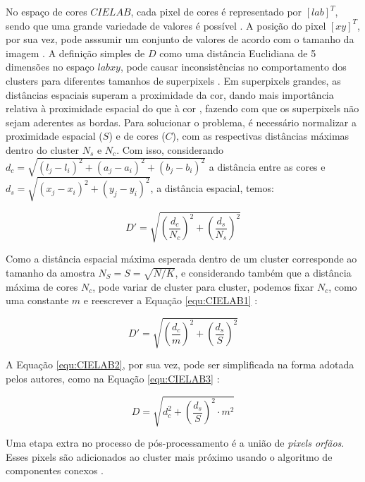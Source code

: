 \begin{document}
No espaço de cores $CIELAB$, cada pixel de cores é representado por $[l a b]^T$, sendo que uma grande variedade de valores é possível \cite{SLIC}. A posição do pixel $[x y]^T$, por sua vez, pode asssumir um conjunto de valores de acordo com o tamanho da imagem \cite{SLIC}. A definição simples de $D$ como uma distância Euclidiana de 5 dimensões no espaço $labxy$, pode causar inconsistências no comportamento dos clusters para diferentes tamanhos de superpixels \cite{SLIC}. Em superpixels grandes, as distâncias espaciais superam a proximidade da cor, dando mais importância relativa à proximidade espacial do que à cor \cite{SLIC}, fazendo com que os superpixels não sejam aderentes as bordas. Para solucionar o problema, é necessário normalizar a proximidade espacial ($S$) e de cores ($C$), com as respectivas distâncias máximas dentro do cluster $N_s$ e $N_c$. Com isso, considerando $d_c = \sqrt{(l_j - l_i)^2 + (a_j - a_i)^2 + (b_j - b_i)^2}$ a distância entre as cores e $d_s =  \sqrt{(x_j - x_i)^2 + (y_j - y_i)^2}$, a distância espacial, temos:

\begin{equation}
 D' = \sqrt{ \left(\frac{d_c}{N_c} \right)^2 + \left(\frac{d_s}{N_s} \right)^2}
 \label{equ:CIELAB1}
\end{equation}

Como a distância espacial máxima esperada dentro de um cluster corresponde ao tamanho da amostra $N_S = S = \sqrt{N/K}$, e considerando também que a distância máxima de cores $N_c$, pode variar de cluster para cluster, podemos fixar $N_c$, como uma constante $m$ e reescrever a Equação \ref{equ:CIELAB1} \cite{SLIC}:

\begin{equation}
 D' = \sqrt{ \left(\frac{d_c}{m} \right)^2 + \left(\frac{d_s}{S} \right)^2}
 \label{equ:CIELAB2}
\end{equation}

A Equação \ref{equ:CIELAB2}, por sua vez, pode ser simplificada na forma adotada pelos autores, como na Equação \ref{equ:CIELAB3} \cite{SLIC}:

\begin{equation}
 D = \sqrt{d_c^2 + \left(\frac{d_s}{S} \right)^2 \cdot m^2}
 \label{equ:CIELAB3}
\end{equation}

Uma etapa extra no processo de pós-processamento é a união de \textit{pixels orfãos}. Esses pixels são adicionados ao cluster mais próximo usando o algoritmo de componentes conexos \cite{SLIC}.
\end{document}
